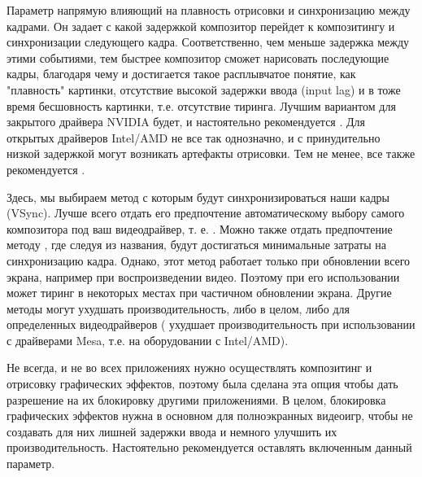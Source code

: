 \documentclass[letterpaper,10pt,russian,openany]{sphinxmanual}
\begin{document}
\sphinxAtStartPar
{}

\sphinxAtStartPar
Параметр напрямую влияющий на плавность отрисовки и синхронизацию между кадрами.
Он задает с какой задержкой композитор перейдет к композитингу и синхронизации следующего кадра.
Соответственно, чем меньше задержка между этими событиями, тем быстрее композитор сможет нарисовать последующие кадры,
благодаря чему и достигается такое расплывчатое понятие, как "плавность" картинки,
отсутствие высокой задержки ввода (input lag) и в тоже время бесшовность картинки, т.е. отсутствие тиринга.
Лучшим вариантом для закрытого драйвера NVIDIA будет, и настоятельно рекомендуется \sphinxhyphen{} .
Для открытых драйверов Intel/AMD не все так однозначно, и с принудительно низкой задержкой могут возникать артефакты отрисовки.
Тем не менее, все также рекомендуется .

\sphinxAtStartPar
{}

\sphinxAtStartPar
Здесь, мы выбираем метод с которым будут синхронизироваться наши кадры (VSync).
Лучше всего отдать его предпочтение автоматическому выбору самого композитора под ваш видеодрайвер, т. е. .
Можно также отдать предпочтение методу , где следуя из названия, будут достигаться минимальные затраты на синхронизацию кадра.
Однако, этот метод работает только при обновлении всего экрана, например при воспроизведении видео.
Поэтому при его использовании может  тиринг в некоторых местах при частичном обновлении экрана.
Другие методы могут ухудшать производительность, либо в целом, либо для определенных видеодрайверов
( ухудшает производительность при использовании с драйверами Mesa, т.е. на оборудовании с Intel/AMD).

\sphinxAtStartPar
{}

\sphinxAtStartPar
Не всегда, и не во всех приложениях нужно осуществлять композитинг и отрисовку графических эффектов,
поэтому была сделана эта опция чтобы дать разрешение на их блокировку другими приложениями.
В целом, блокировка графических эффектов нужна в основном для полноэкранных видеоигр,
чтобы не создавать для них лишней задержки ввода и немного улучшить их производительность.
Настоятельно рекомендуется оставлять включенным данный параметр.
\end{document}
